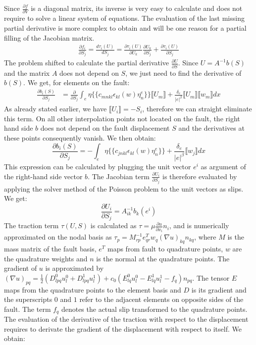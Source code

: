 Since $\frac{\partial f}{\partial V}$ is a diagonal matrix, its inverse is very easy to calculate and does not require to solve a linear system of equations. The evaluation of the last missing partial derivative is more complex to obtain and will be one reason for a partial filling of the Jacobian matrix.
\begin{align}
\label{eq:partialDerivative_df_dS}
\frac{\partial f_i}{\partial S_j} = \frac{d \tau_i(U)}{d S_j} = \frac{\partial \tau_i(U)}{\partial U_k}\frac{\partial U_k}{\partial S_j} + \frac{\partial \tau_i(U)}{\partial S_j}
\end{align}
The problem shifted to calculate the partial derivative $\frac{\partial U}{\partial S}$. Since $U = A^{-1}b(S)$ and the matrix $A$ does not depend on $S$, we just need to find the derivative of $b(S)$. We get, for elements on the fault:
\begin{align}
\frac{\partial b_i(S)}{\partial S_j} &= \frac{\partial }{\partial S_j}\int_e \eta \{\{c_{mnkl}\epsilon_{kl}(w)\eta_n^e\}\}\llbracket U_m \rrbracket + \frac{\delta_e}{|e|^\beta}\llbracket U_m \rrbracket\llbracket w_m \rrbracket dx
\end{align}
As already stated earlier, we have $\llbracket U_i \rrbracket = -S_i$, therefore we can straight eliminate this term. On all other interpolation points not located on the fault, the right hand side $b$ does not depend on the fault displacement $S$ and the derivatives at these points consequently vanish. We then obtain:
\begin{equation}
\frac{\partial b_i(S)}{\partial S_j} = -\int_e 
\eta  \{\{c_{jnkl}\epsilon_{kl}(w)\eta_n^e\}\} +
\frac{\delta_e}{|e|^\beta}\llbracket w_j \rrbracket dx
\end{equation}
This expression can be calculated by plugging the unit vector $e^i$ as argument of the right-hand side vector $b$. The Jacobian term $\frac{\partial U_i}{\partial S_j}$ is therefore evaluated by applying the solver method of the Poisson problem to the unit vectors as slips. We get:
\begin{equation}
\frac{\partial U_i}{\partial S_j} = A_{ik}^{-1}b_k(e^i)
\end{equation}
The traction term $\tau(U,S)$ is calculated as $\tau = \mu \frac{\partial u}{\partial x_i}n_i$, and is numerically approximated on the nodal basis as $\tau_p = M_{rp}^{-1}e_{qr}^Tw_q(\nabla u)_{kq}n_{kq}$, where $M$ is the mass matrix of the fault basis, $e^T$ maps from fault to quadrature points, $w$ are the quadrature weights and $n$ is the normal at the quadrature points. The gradient of $u$ is approximated by $(\nabla u)_{pq} = \frac{1}{2}\left(D_{lpq}^0u_l^0 + D_{lpq}^1u_l^1\right) + c_0\left(E_{lq}^0u_l^0 - E_{lq}^1u_l^1 - f_q\right)n_{pq}$. The tensor $E$ maps from the quadrature points to the element basis and $D$ is its gradient and the superscripts $0$ and $1$ refer to the adjacent elements on opposite sides of the fault. The term $f_q$ denotes the actual slip transformed to the quadrature points. The evaluation of the derivative of the traction with respect to the displacement requires to derivate the gradient of the displacement with respect to itself. We obtain: 
